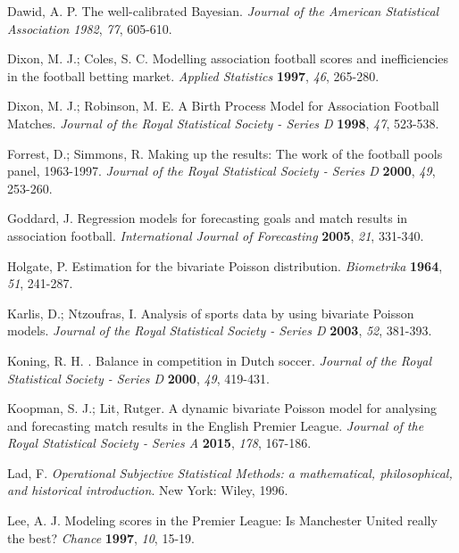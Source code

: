 \documentclass[journal,article,accept,moreauthors,pdftex,12pt,a4paper]{mdpi}
\begin{document}
\begin{thebibliography}{999}
         Dawid, A. P. The well-calibrated Bayesian.
        {\em Journal of the American Statistical Association} {\em 1982}, {\em 77}, 605-610.

         Dixon, M. J.; Coles, S. C. Modelling association football scores and inefficiencies in the football betting market. {\em Applied Statistics} {\bf 1997}, {\em 46}, 265-280.

         Dixon, M. J.; Robinson, M. E. A Birth Process Model for Association Football Matches. {\em Journal of the Royal Statistical Society - Series D}
        {\bf 1998}, {\em 47}, 523-538.

         Forrest, D.; Simmons, R. Making up the results: The work
        of the football pools panel, 1963-1997. {\em Journal of the Royal Statistical Society - Series D} {\bf 2000}, {\em 49}, 253-260.

        Goddard, J. Regression models for forecasting goals and match
        results in association football. {\em International Journal of
            Forecasting} {\bf 2005}, {\em 21}, 331-340.

        Holgate, P. Estimation for the bivariate Poisson distribution. {\em Biometrika} {\bf 1964}, {\em 51}, 241-287.

        Karlis, D.; Ntzoufras, I. Analysis of sports data by using bivariate
        Poisson models. {\em Journal of the Royal Statistical Society - Series D} {\bf 2003}, {\em 52}, 381-393.

        Koning, R. H. . Balance in competition in Dutch soccer. {\em Journal of the Royal Statistical Society - Series D} {\bf 2000}, {\em 49}, 419-431.

        Koopman, S. J.; Lit, Rutger. A dynamic bivariate Poisson model for
        analysing and forecasting match results in the English Premier
        League. {\em Journal of the Royal Statistical Society - Series A}
        {\bf 2015}, {\em 178}, 167-186.

        Lad, F. {\it Operational Subjective Statistical Methods: a mathematical,
            philosophical, and historical introduction}. New York: Wiley, 1996.

        Lee, A. J. Modeling scores in the Premier League: Is Manchester United really the best? {\em Chance} {\bf 1997}, {\em 10}, 15-19.


\end{thebibliography}
\end{document}
